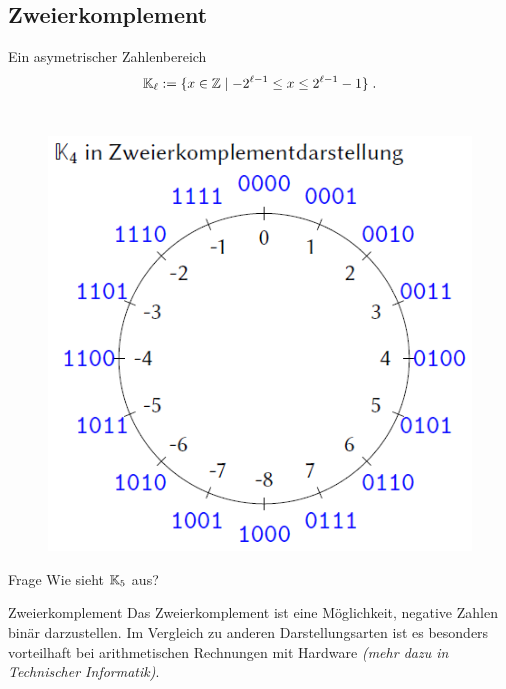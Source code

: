 \subsection{Zweierkomplement}
\begin{frame}{Ein asymetrischer Zahlenbereich}
	\[
	\mathbb{K}_{\ell} := \{ x\in \mathbb{Z}\mid -2^{\ell-1} \leq x \leq 2^{\ell-1} -1 \} \;.
	\]
	\\[0.2cm]
	
	\begin{figure}
		\centering
		\includegraphics[scale=0.35]{../topics/codierung/ZK_K4}
	\end{figure}

	\begin{exampleblock}{Frage}
		Wie sieht $\mathbb{K}_5$ aus?
	\end{exampleblock}
\end{frame}

\begin{frame}{Zweierkomplement} %
    Das Zweierkomplement ist eine Möglichkeit, negative Zahlen binär darzustellen. Im Vergleich zu anderen Darstellungsarten ist es besonders vorteilhaft bei arithmetischen Rechnungen mit Hardware \textit{(mehr dazu in Technischer Informatik)}.
\end{frame}

